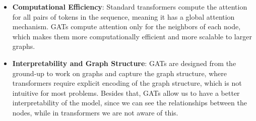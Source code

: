 \documentclass{article}
\begin{document}
\begin{itemize}
    \item \textbf{Computational Efficiency}: Standard transformers compute the attention for all pairs of tokens in the sequence, meaning it has a global attention mechanism.
GATs compute attention only for the neighbors of each node, which makes them more computationally efficient and more scalable to larger graphs.
    \item \textbf{Interpretability and Graph Structure}: GATs are designed from the ground-up to work on graphs and capture the graph structure, where transformers require explicit encoding of the graph structure,
which is not intuitive for most problems. Besides that, GATs allow us to have a better interpretability of the model, since we can see the relationships between the nodes, while in transformers
we are not aware of this. 
\end{itemize}






























\newpage

 
\end{document}
